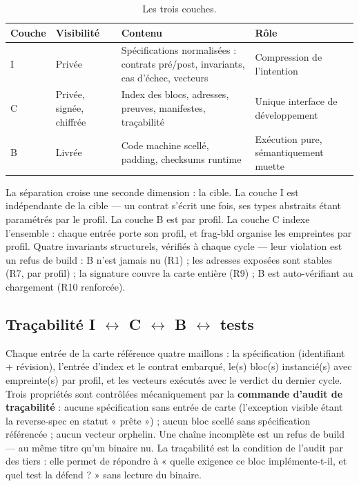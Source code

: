 \begin{table}[htbp]
\centering\small
\caption{Les trois couches.}
\label{tab:couches}
\begin{tabularx}{\textwidth}{@{}l l Y Y@{}}
\toprule
\textbf{Couche} & \textbf{Visibilité} & \textbf{Contenu} & \textbf{Rôle} \\
\midrule
I & Privée & Spécifications normalisées : contrats pré/post, invariants, cas d’échec,
vecteurs & Compression de l’intention \\
C & Privée, signée, chiffrée & Index des blocs, adresses, preuves, manifestes,
traçabilité & Unique interface de développement \\
B & Livrée & Code machine scellé, padding, checksums runtime & Exécution pure,
sémantiquement muette \\
\bottomrule
\end{tabularx}
\end{table}

La séparation croise une seconde dimension : la cible. La couche I est indépendante de la
cible — un contrat s’écrit une fois, ses types abstraits étant paramétrés par le profil.
La couche B est par profil. La couche C indexe l’ensemble : chaque entrée porte son
profil, et frag-bld organise les empreintes par profil. Quatre invariants structurels,
vérifiés à chaque cycle — leur violation est un refus de build : B n’est jamais nu (R1) ;
les adresses exposées sont stables (R7, par profil) ; la signature couvre la carte entière
(R9) ; B est auto-vérifiant au chargement (R10 renforcée).

\subsection{Traçabilité I $\leftrightarrow$ C $\leftrightarrow$ B $\leftrightarrow$
tests}\label{sec:traceabilite}

Chaque entrée de la carte référence quatre maillons : la spécification (identifiant +
révision), l’entrée d’index et le contrat embarqué, le(s) bloc(s) instancié(s) avec
empreinte(s) par profil, et les vecteurs exécutés avec le verdict du dernier cycle. Trois
propriétés sont contrôlées mécaniquement par la \textbf{commande d’audit de traçabilité} :
aucune spécification sans entrée de carte (l’exception visible étant la reverse-spec en
statut « prête ») ; aucun bloc scellé sans spécification référencée ; aucun vecteur
orphelin. Une chaîne incomplète est un refus de build — au même titre qu’un binaire nu.
La traçabilité est la condition de l’audit par des tiers : elle permet de répondre à
« quelle exigence ce bloc implémente-t-il, et quel test la défend ? » sans lecture du
binaire.

